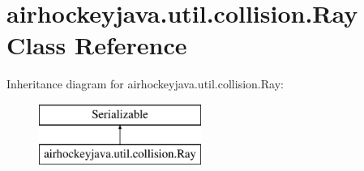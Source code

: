 \hypertarget{classairhockeyjava_1_1util_1_1collision_1_1_ray}{}\section{airhockeyjava.\+util.\+collision.\+Ray Class Reference}
\label{classairhockeyjava_1_1util_1_1collision_1_1_ray}
Inheritance diagram for airhockeyjava.\+util.\+collision.\+Ray\+:\begin{figure}[H]
\begin{center}
\leavevmode
\includegraphics[height=2.000000cm]{classairhockeyjava_1_1util_1_1collision_1_1_ray}
\end{center}
\end{figure}
